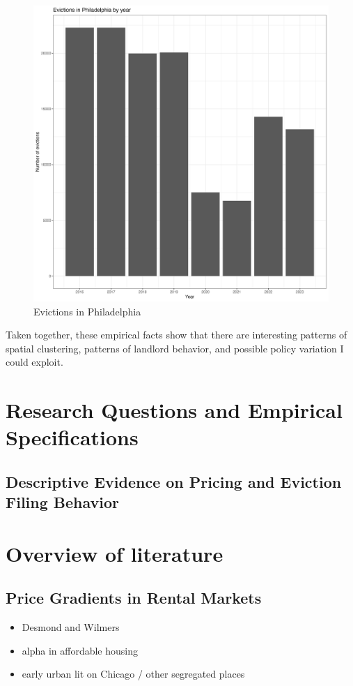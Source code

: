 \documentclass{article}
\begin{document}
\begin{figure}[htbp]
    \centering
    \includegraphics[width=1\linewidth]{figs/evict_by_year.png}
    \caption{Evictions in Philadelphia}
    \label{fig:philly-year}
\end{figure}

Taken together, these empirical facts show that there are interesting patterns of spatial clustering, patterns of landlord behavior, and possible policy variation I could exploit.
\pagebreak
\section{Research Questions and Empirical Specifications}

\subsection{Descriptive Evidence on Pricing and Eviction Filing Behavior}

\section{Overview of literature}
\subsection{Price Gradients in Rental Markets}
\begin{itemize}
    \item Desmond and Wilmers
    \item alpha in affordable housing
    \item early urban lit on Chicago / other segregated places
\end{itemize}
\end{document}
